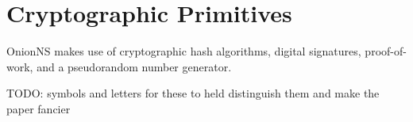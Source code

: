 






\section{Cryptographic Primitives}

OnionNS makes use of cryptographic hash algorithms, digital signatures, proof-of-work, and a pseudorandom number generator.

TODO: symbols and letters for these to held distinguish them and make the paper fancier

